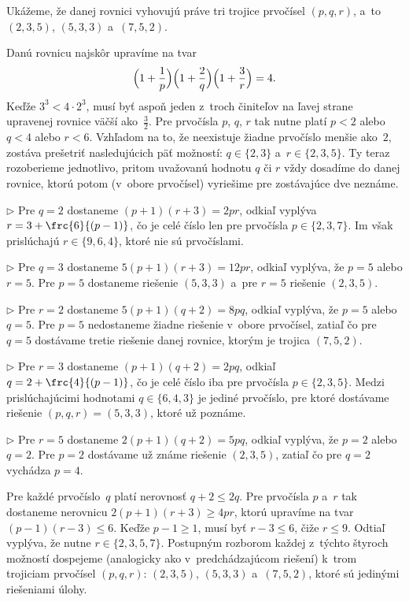 {%
Ukážeme, že danej rovnici vyhovujú práve tri trojice prvočísel $(p,q,r)$,
a~to $(2,3,5)$, $(5,3,3)$ a~$(7,5,2)$.

\smallskip
Danú rovnicu najskôr upravíme na tvar
$$
\Bigl(1+\frac{1}{p}\Bigr)\Bigl(1+\frac{2}{q}\Bigr)\Bigl(1+\frac{3}{r}\Bigr)=4.
$$
Keďže $3^{3}<4\cdot 2^{3}$, musí byť aspoň jeden
z~troch činiteľov na ľavej strane upravenej rovnice väčší
ako~$\frac32$. Pre prvočísla $p$, $q$, $r$ tak nutne platí $p<2$ alebo $q<4$
alebo $r<6$. Vzhľadom na to, že neexistuje žiadne prvočíslo
menšie ako~$2$, zostáva prešetriť nasledujúcich päť možností: $q \in \{2,3\}$ a~$r\in \{2,3,5\}$.
Ty teraz rozoberieme jednotlivo, pritom uvažovanú hodnotu $q$ či $r$ vždy
dosadíme do danej rovnice, ktorú potom (v~obore prvočísel) vyriešime pre zostávajúce
dve neznáme.

\item{$\triangleright$} Pre $q=2$ dostaneme $(p+1)(r+3)=2pr$, odkiaľ vyplýva
      $r=3+\frc{6}{(p-1)}$, čo je celé číslo len pre prvočísla $p\in\{2,3,7\}$. Im však
        prislúchajú $r\in\{9,6,4\}$, ktoré nie sú prvočíslami.
\item{$\triangleright$} Pre $q=3$ dostaneme $5(p+1)(r+3)=12pr$, odkiaľ vyplýva, že $p=5$
        alebo $r=5$. Pre $p=5$ dostaneme riešenie $(5,3,3)$ a~pre $r=5$ riešenie $(2,3,5)$.
\item{$\triangleright$} Pre $r=2$ dostaneme $5(p+1)(q+2)=8pq$, odkiaľ vyplýva, že
      $p=5$ alebo $q=5$. Pre $p=5$
      nedostaneme žiadne riešenie v~obore prvočísel, zatiaľ čo pre $q=5$ dostávame tretie riešenie danej
      rovnice, ktorým je trojica $(7,5,2)$.
\item{$\triangleright$} Pre $r=3$ dostaneme $(p+1)(q+2)=2pq$, odkiaľ
      $q=2+\frc{4}{(p-1)}$, čo je celé číslo iba pre prvočísla
      $p\in\{2,3,5\}$. Medzi prislúchajúcimi hodnotami $q\in\{6,4,3\}$ je jediné prvočíslo,
      pre ktoré dostávame riešenie $(p,q,r)=(5,3,3)$, ktoré už poznáme.
\item{$\triangleright$} Pre $r=5$ dostaneme $2(p+1)(q+2)=5pq$, odkiaľ vyplýva, že
      $p=2$ alebo $q=2$. Pre $p=2$
       dostávame už známe riešenie $(2,3,5)$, zatiaľ čo pre $q=2$ vychádza $p=4$.


\ineriesenie
Pre každé prvočíslo~$q$ platí nerovnosť $q+2\le 2q$. Pre prvočísla $p$ a~$r$
tak dostaneme nerovnicu $2(p+1)(r+3)\ge 4pr$, ktorú
upravíme na tvar ${(p-1)(r-3)}\le 6$. Keďže $p-1\ge1$,
musí byť $r-3\le 6$, čiže $r\le 9$. Odtiaľ vyplýva, že nutne $r\in\{2,3,5,7\}$.
Postupným rozborom každej z~týchto štyroch možností dospejeme
(analogicky ako v~predchádzajúcom riešení) k~trom trojiciam prvočísel $(p,q,r)$:
$(2,3,5)$, $(5,3,3)$ a~$(7,5,2)$, ktoré sú jedinými riešeniami úlohy.

}
